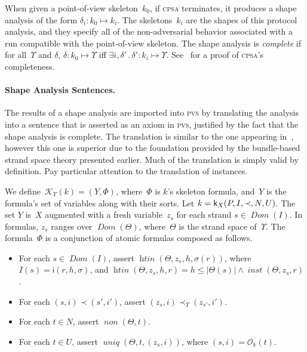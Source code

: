 \documentclass[titlepage,12pt]{article}
\newcommand{\cpsa}{\textsc{cpsa}}
\newcommand{\pvs}{\textsc{pvs}}
\newcommand{\fn}[1]{\ensuremath{\operatorname{\mathit{#1}}}}
\newcommand{\typ}{\mathbin:}
\newcommand{\sdom}{\fn{Dom}}
\newcommand{\some}[1]{\exists#1\mathpunct.}
\newcommand{\form}{\mathcal{K}}
\newcommand{\skel}{\mathsf{k}}
\newcommand{\insta}{\mathsf{i}}
\newcommand{\orig}{\mathcal{O}}
\begin{document}
When given a point-of-view skeleton~$k_0$, if {\cpsa} terminates, it
produces a shape analysis of the form $\delta_i\typ k_0\mapsto k_i$.
The skeletons~$k_i$ are the shapes of this protocol analysis, and they
specify all of the non-adversarial behavior associated with a run
compatible with the point-of-view skeleton.  The shape analysis is
\emph{complete} if for all~$\Upsilon$
and $\delta$, $\delta\typ k_0\mapsto\Upsilon$ iff
$\some{i,\delta'}\delta'\typ k_i\mapsto\Upsilon$.
See~\cite{cpsatheory11} for a proof of {\cpsa}'s completeness.

\paragraph{Shape Analysis Sentences.}
The results of a shape analysis are imported into {\pvs} by translating
the analysis into a sentence that is asserted as an axiom in {\pvs},
justified by the fact that the shape analysis is complete.  The
translation is similar to the one appearing in~\cite{Ramsdell12},
however this one is superior due to the foundation provided by the
bundle-based strand space theory presented earlier.  Much of the
translation is simply valid by definition.  Pay particular attention
to the translation of instances.

We define~$\form_\Upsilon(k)=(Y,\Phi)$, where~$\Phi$ is $k$'s
skeleton formula, and~$Y$ is the formula's set
of variables along with their sorts.  Let $k=\skel_X(P,I,\prec,\break N,U)$.
The set $Y$ is~$X$ augmented with a fresh variable~$z_s$ for each
strand $s\in\sdom(I)$.  In formulas, $z_s$ ranges over
$\sdom(\Theta)$, where~$\Theta$ is the strand space of~$\Upsilon$.
The formula~$\Phi$ is a conjunction of atomic formulas composed as
follows.

\begin{itemize}
\item For each $s\in\sdom(I)$, assert $\fn{htin}(\Theta, z_s, h,
  \sigma(r))$, where $I(s)=\insta(r,h,\sigma)$,
  and\index{htin@\fn{htin}}\index{inst@\fn{inst}} $\fn{htin}(\Theta, z_s,
  h,r)=h\leq|\Theta(s)|\wedge\fn{inst}(\Theta, z_s,r)$.
\item For each $(s,i)\prec(s',i')$, assert
  $(z_s,i)\prec_\Upsilon(z_{s'},i')$.
\item For each $t\in N$, assert $\fn{non}(\Theta,t)$.
\item For each $t\in U$, assert $\fn{uniq}(\Theta, t,(z_s, i))$,
  where $(s,i)=\orig_k(t)$.
\end{itemize}
\end{document}
